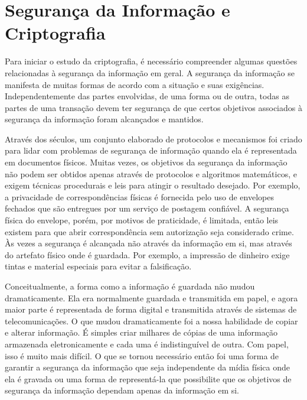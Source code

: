 \documentclass[
	10pt,				%
	openright,			%
	twoside,			%
	a5paper,			%
	english,			%
	french,				%
	spanish,			%
	brazil,				%
	sumario=tradicional
]{abntex2}
\begin{document}
\section{Segurança da Informação e Criptografia}

Para iniciar o estudo da criptografia, é necessário compreender algumas questões relacionadas à segurança da informação em geral. A segurança da informação se manifesta de muitas formas de acordo com a situação e suas exigências. Independentemente das partes envolvidas, de uma forma ou de outra, todas as partes de uma transação devem ter segurança de que certos objetivos associados à segurança da informação foram alcançados e mantidos.

Através dos séculos, um conjunto elaborado de protocolos e mecanismos foi criado para lidar com problemas de segurança de informação quando ela é representada em documentos físicos. Muitas vezes, os objetivos da segurança da informação não podem ser obtidos apenas através de protocolos e algoritmos matemáticos, e exigem técnicas procedurais e leis para atingir o resultado desejado. Por exemplo, a privacidade de correspondências físicas é fornecida pelo uso de envelopes fechados que são entregues por um serviço de postagem confiável. A segurança física do envelope, porém, por motivos de praticidade, é limitada, então leis existem para que abrir correspondência sem autorização seja considerado crime. Às vezes a segurança é alcançada não através da informação em si, mas através do artefato físico onde é guardada. Por exemplo, a impressão de dinheiro exige tintas e material especiais para evitar a falsificação.

Conceitualmente, a forma como a informação é guardada não mudou dramaticamente. Ela era normalmente guardada e transmitida em papel, e agora maior parte é representada de forma digital e transmitida através de sistemas de telecomunicações. O que mudou dramaticamente foi a nossa habilidade de copiar e alterar informação. É simples criar milhares de cópias de uma informação armazenada eletronicamente e cada uma é indistinguível de outra. Com papel, isso é muito mais difícil. O que se tornou necessário então foi uma forma de garantir a segurança da informação que seja independente da mídia física onde ela é gravada ou uma forma de representá-la que possibilite que os objetivos de segurança da informação dependam apenas da informação em si.
\end{document}
